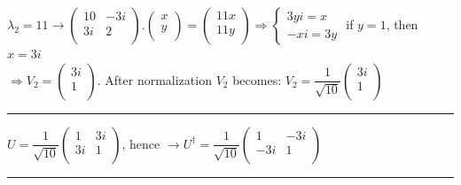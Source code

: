 \documentclass[fleqn]{article}
\begin{document}
\begin{enumerate}
      \textcolor{hwColor}{
        $
         \lambda_2=11 \rightarrow \begin{pmatrix}
          10 & -3i \\
          3i & 2 \\
         \end{pmatrix}.\begin{pmatrix}
           x \\
           y \\
         \end{pmatrix}=\begin{pmatrix}
          11x \\
          11y \\
        \end{pmatrix} \Longrightarrow 
        \begin{cases}
          3yi=x \\
          -xi=3y
        \end{cases} 
        $
        if $y=1$, then $x=3i$ \\
        $
          \Longrightarrow
          V_2=\begin{pmatrix}
            3i \\
            1 \\
          \end{pmatrix}
        $.
        After normalization $V_2$ becomes:
        $
        V_2=\dfrac{1}{\sqrt{10}}\begin{pmatrix}
          3i \\
          1 \\
        \end{pmatrix}
        $
      }

      \textcolor{hwColor}{
        \rule{16cm}{0.4pt}
      }

      \textcolor{hwColor}{
        $
          U=\dfrac{1}{\sqrt{10}}\begin{pmatrix}
            1 & 3i \\
            3i & 1 \\
          \end{pmatrix}
        $, hence 
        $
          \rightarrow 
          U^\dagger=\dfrac{1}{\sqrt{10}}\begin{pmatrix}
            1 & -3i \\
            -3i & 1 \\
          \end{pmatrix}
        $
      }

      \textcolor{hwColor}{
        \rule{16cm}{0.4pt}
      }


\end{enumerate}
\end{document}
